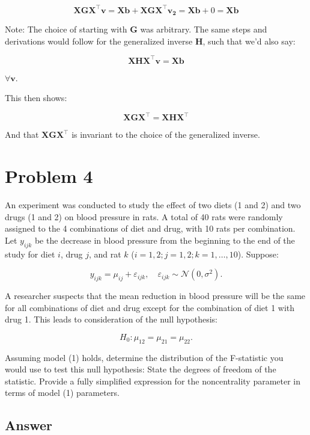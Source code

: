 \documentclass[
]{article}
\begin{document}
\[
\boldsymbol{X G X^\top v} = \boldsymbol{X b} + \boldsymbol{X G X^\top v_2} = \boldsymbol{X b} + 0 = \boldsymbol{X b}
\]

Note: The choice of starting with \(\boldsymbol{G}\) was arbitrary. The
same steps and derivations would follow for the generalized inverse
\(\boldsymbol{H}\), such that we'd also say:

\[
\boldsymbol{X H X^\top v} = \boldsymbol{X b}
\]

\(\forall \boldsymbol{v}\).

This then shows:

\[
\boldsymbol{X G X^\top} = \boldsymbol{X H X^\top}
\]

And that \(\boldsymbol{X G X^\top}\) is invariant to the choice of the
generalized inverse.

\newpage

\section{Problem 4}\label{problem-4}

An experiment was conducted to study the effect of two diets (1 and 2)
and two drugs (1 and 2) on blood pressure in rats. A total of 40 rats
were randomly assigned to the 4 combinations of diet and drug, with 10
rats per combination. Let \(y_{ijk}\) be the decrease in blood pressure
from the beginning to the end of the study for diet \(i\), drug \(j\),
and rat \(k\) (\(i = 1, 2; j = 1, 2; k = 1, \dots, 10\)). Suppose:

\[
y_{ijk} = \mu_{ij} + \varepsilon_{ijk}, \quad \varepsilon_{ijk} \sim \mathcal{N}(0, \sigma^2).
\]

A researcher suspects that the mean reduction in blood pressure will be
the same for all combinations of diet and drug except for the
combination of diet 1 with drug 1. This leads to consideration of the
null hypothesis:

\[
H_0: \mu_{12} = \mu_{21} = \mu_{22}.
\]

Assuming model (1) holds, determine the distribution of the F-statistic
you would use to test this null hypothesis: State the degrees of freedom
of the statistic. Provide a fully simplified expression for the
noncentrality parameter in terms of model (1) parameters.

\subsection{Answer}\label{answer-2}
\end{document}
